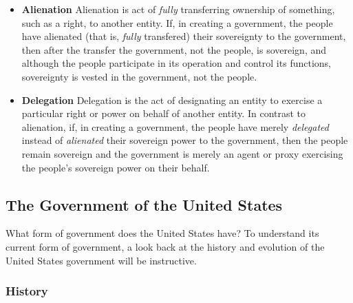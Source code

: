 \begin{itemize}
\item \textbf{Alienation} Alienation is act of \textit{fully} transferring ownership of something, such as a right, to another entity.  If, in creating a government, the people have alienated (that is, \textit{fully} transfered) their sovereignty to the government, then after the transfer the government, not the people, is sovereign, and although the people participate in its operation and control its functions, sovereignty is vested in the government, not the people.

\item \textbf{Delegation} Delegation is the act of designating an entity to exercise a particular right or power on behalf of another entity.  In contrast to alienation, if, in creating a government, the people have merely \textit{delegated} instead of \textit{alienated} their sovereign power to the government, then the people remain sovereign and the government is merely an agent or proxy exercising the people's sovereign power on their behalf.
\end{itemize}


\subsection{The Government of the United States}

What form of government does the United States have?  To understand its current form of government, a look back at the history and evolution of the United States government will be instructive.

\subsubsection{History}

